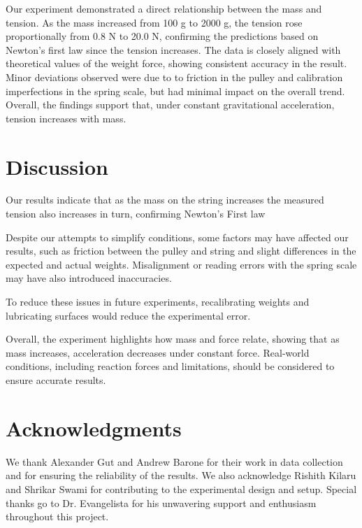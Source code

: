 \documentclass[aps, prl, twocolumn, 10pt]{revtex4-2}
\begin{document}
        Our experiment demonstrated a direct relationship between the mass and tension. As the mass increased from 100 g to 2000 g, the tension rose proportionally from 0.8 N to 20.0 N, confirming the predictions based on Newton's first law since the tension increases. The data is closely aligned with theoretical values of the weight force, showing consistent accuracy in the result. Minor deviations observed were due to to friction in the pulley and calibration imperfections in the spring scale, but had minimal impact on the overall trend. Overall, the findings support that, under constant gravitational acceleration, tension increases with mass. 
    
    \section*{Discussion}
        \hrulefill
        
        Our results indicate that as the mass on the string increases the measured tension also increases in turn, confirming Newton's First law
        
        Despite our attempts to simplify conditions, some factors may have affected our results, such as friction between the pulley and string and slight differences in the expected and actual weights. Misalignment or reading errors with the spring scale may have also introduced inaccuracies.
        
        To reduce these issues in future experiments, recalibrating weights and lubricating surfaces would reduce the experimental error.
        
        Overall, the experiment highlights how mass and force relate, showing that as mass increases, acceleration decreases under constant force. Real-world conditions, including reaction forces and limitations, should be considered to ensure accurate results.
    
    \section*{Acknowledgments}
        \hrulefill
        
        We thank Alexander Gut and Andrew Barone for their work in data collection and for ensuring the reliability of the results. We also acknowledge Rishith Kilaru and Shrikar Swami for contributing to the experimental design and setup. Special thanks go to Dr. Evangelista for his unwavering support and enthusiasm throughout this project.
        
\end{document}
